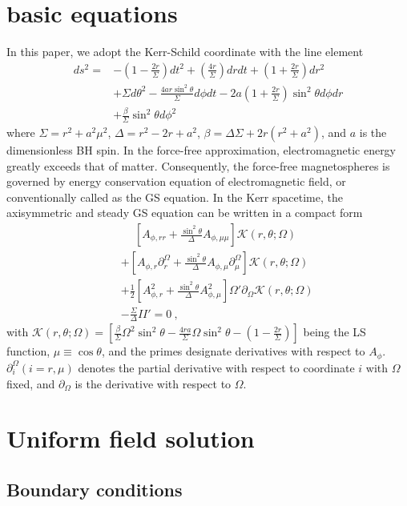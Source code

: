 \documentclass[aps,prd,reprint,nofootinbib, superscriptaddress]{revtex4-1}
\def\nn{\nonumber}
\def\ct{\cos\theta}
\def\sst{\sin^2\theta}
\def\Ar{A_{\phi,r}}
\def\Arr{A_{\phi,rr}}
\def\Am{A_{\phi,\mu}}
\def\Amm{A_{\phi,\mu\mu}}
\def\ben{\begin{eqnarray}}
\def\een{\end{eqnarray}}
\begin{document}
\section{basic equations}
\label{sec:basic}
In this paper, we adopt the Kerr-Schild
coordinate with the line element
\[
\begin{aligned}
ds^2 =
&-\left( 1-\frac{2r}{\Sigma} \right)dt^2 + \left( \frac{4
r}{\Sigma} \right) dr dt + \left(1+\frac{2r}{\Sigma} \right) dr^2 \\
&+ \Sigma d\theta^2 - \frac{4 a r \sin^2\theta}{\Sigma} d\phi dt
- 2 a \left(1+\frac{2r}{\Sigma}\right) \sin^2\theta d\phi dr     \\
& + \frac{\beta}{\Sigma} \sst d\phi^2
\end{aligned}
\]
where $\Sigma = r^2 + a^2 \mu^2$, $\Delta = r^2 -2r + a^2$,
$\beta = \Delta\Sigma + 2r(r^2 + a^2)$, and $a$ is the dimensionless BH spin.
In the force-free approximation, electromagnetic energy greatly exceeds that of matter.
Consequently, the force-free magnetospheres is governed by energy
conservation equation of electromagnetic field, or
conventionally called as the GS equation.
In the Kerr spacetime,
the axisymmetric and steady GS equation can be written in a compact form \cite{Pan2017}
\ben
\label{eq:GSg}
&&\phantom{+}
 \left[\Arr + \frac{\sst}{\Delta}\Amm \right]  \mathcal K(r,\theta; \Omega )\nn \\
&&
+\left[\Ar \partial_r^\Omega  +  \frac{\sst}{\Delta}\Am \partial_\mu^\Omega\right] \mathcal K(r,\theta; \Omega ) \nn \\
&&
+ \frac{1}{2}\left[\Ar^2 + \frac{\sst}{\Delta}\Am^2\right]  \Omega' \partial_\Omega \mathcal K(r,\theta; \Omega )\nn \\
&&
- \frac{\Sigma}{\Delta}II' = 0 \ ,
\een
with $\mathcal K(r,\theta; \Omega )= \left[\frac{\beta}{\Sigma}\Omega^2 \sst
-\frac{4ra}{\Sigma}\Omega \sst
-\left(1-\frac{2r}{\Sigma}\right)\right]$ being the LS function,
$\mu\equiv\ct$,  and  the primes designate  derivatives with respect to $A_\phi$.
$\partial_i^\Omega (i=r, \mu)$  denotes the partial derivative
with respect to coordinate $i$ with $\Omega$ fixed, and $\partial_\Omega$ is the derivative with
respect to $\Omega$.

\section{Uniform field solution}

\subsection{Boundary conditions}
\end{document}
